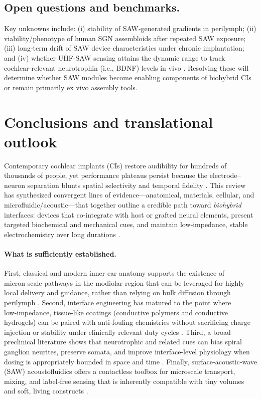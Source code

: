 \documentclass[referee,pdflatex, sn-vancouver-num]{sn-jnl}%
\theoremstyle{thmstyleone}%
\theoremstyle{thmstyletwo}%
\theoremstyle{thmstylethree}%
\begin{document}
\subsection{Open questions and benchmarks.}
Key unknowns include: (i) stability of SAW‑generated gradients in perilymph; (ii) viability/phenotype of human SGN assembloids after repeated SAW exposure; (iii) long‑term drift of SAW device characteristics under chronic implantation; and (iv) whether UHF‑SAW sensing attains the dynamic range to track cochlear‑relevant neurotrophin (i.e., BDNF) levels in vivo \cite{rufo2022,Agostini2021_UHFSAW}. Resolving these will determine whether SAW modules become enabling components of biohybrid CIs or remain primarily ex vivo assembly tools.

\section{Conclusions and translational outlook}\label{sec8}


\noindent
Contemporary cochlear implants (CIs) restore audibility for hundreds of thousands of people, yet performance plateaus persist because the electrode–neuron separation blunts spatial selectivity and temporal fidelity \cite{wilson2008,wilson2014,Vecchi2024}. This review has synthesized convergent lines of evidence—anatomical, materials, cellular, and microfluidic/acoustic—that together outline a credible path toward \emph{biohybrid} interfaces: devices that co‑integrate with host or grafted neural elements, present targeted biochemical and mechanical cues, and maintain low‑impedance, stable electrochemistry over long durations \cite{CarnicerLombarte2024AdvMat,Green2012,Goding2017,Dalrymple2020}.

\paragraph{What is sufficiently established.}
First, classical and modern inner‑ear anatomy supports the existence of micron‑scale pathways in the modiolar region that can be leveraged for highly local delivery and guidance, rather than relying on bulk diffusion through perilymph \cite{raskandersen2006,lim1970,SaltPlontke2009,Leake2013}. Second, interface engineering has matured to the point where low‑impedance, tissue‑like coatings (conductive polymers and conductive hydrogels) can be paired with anti‑fouling chemistries without sacrificing charge injection or stability under clinically relevant duty cycles \cite{Green2012,Goding2017,Dalrymple2020,Horne2023}. Third, a broad preclinical literature shows that neurotrophic and related cues can bias spiral ganglion neurites, preserve somata, and improve interface‑level physiology when dosing is appropriately bounded in space and time \cite{Scheper2019,Chang2020,Kempfle2021,StPeter2022}. Finally, surface‑acoustic‑wave (SAW) acoustofluidics offers a contactless toolbox for microscale transport, mixing, and label‑free sensing that is inherently compatible with tiny volumes and soft, living constructs \cite{Friend2011,Ding2013,Agostini2021_UHFSAW}.
\end{document}
